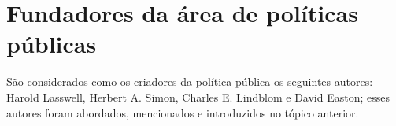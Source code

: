 \section{Fundadores da área de políticas públicas}

São considerados como os criadores da política pública os seguintes autores: Harold Lasswell, Herbert A. Simon, Charles E. Lindblom e David Easton; esses autores foram abordados, mencionados e introduzidos no tópico anterior.
